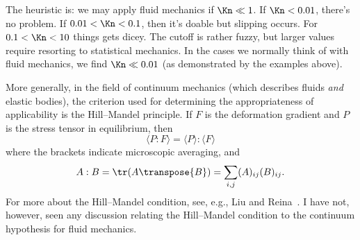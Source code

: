 \begin{node}
\begin{node}\label{fluids:describing-000D}%
The heuristic is: we may apply fluid mechanics if $\Kn\ll1$. If
$\Kn<0.01$, there's no problem. If $0.01<\Kn<0.1$, then it's
doable but slipping occurs. For $0.1<\Kn<10$ things gets dicey. The
cutoff is rather fuzzy, but larger values require resorting to
statistical mechanics. In the cases we normally think of with fluid
mechanics, we find $\Kn\ll0.01$ (as demonstrated by the examples above).
\end{node} %

\begin{node}\label{fluids:describing-000F}%
More generally, in the field of continuum mechanics (which describes
fluids \emph{and} elastic bodies), the criterion used for determining
the appropriateness of applicability is the Hill--Mandel principle. If
$F$ is the deformation gradient and $P$ is the stress tensor in
equilibrium, then
\begin{equation}
\langle P : F\rangle = \langle P \rangle : \langle F \rangle
\end{equation}
where the brackets indicate microscopic averaging, and
\begin{equation*}
A : B = \tr(A\transpose{B}) = \sum_{i,j}(A)_{ij}(B)_{ij}.
\end{equation*}
For more about the Hill--Mandel condition, see, e.g., Liu and
Reina~\cite{liu2016discrete}. I have not, however, seen any discussion
relating the Hill--Mandel condition to the continuum hypothesis for
fluid mechanics.
\end{node} %
\end{node} %

